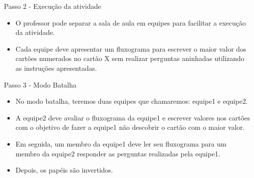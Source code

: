 \documentclass{beamer}
\begin{document}
\begin{frame}{Passo 2 - Execução da atividade}

\begin{itemize}

\item <1->O professor pode separar a sala de aula em equipes para facilitar a execução da atividade.

\item <2->Cada equipe deve apresentar um fluxograma para escrever o maior valor dos cartões numerados no cartão X sem realizar perguntas aninhadas utilizando as instruções apresentadas.


\end{itemize}


\end{frame}


\begin{frame}{Passo 3 - Modo Batalha}

\begin{itemize}

\item <1-> No modo batalha, teremos duas equipes que chamaremos: equipe1 e equipe2.

\item <2-> A equipe2 deve avaliar o fluxograma da equipe1 e escrever valores nos cartões com o objetivo de fazer a equipe1 não descobrir o cartão com o maior valor.

\item <3-> Em seguida, um membro da equipe1 deve ler seu fluxograma para um membro da equipe2 responder as perguntas realizadas pela equipe1.


\item <4-> Depois, os papéis são invertidos.

\end{itemize}


\end{frame}
\end{document}
